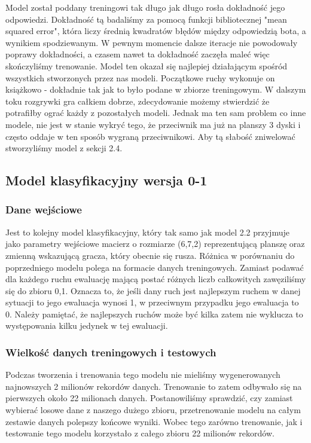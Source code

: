 \documentclass[12pt]{article}
\begin{document}
Model został poddany treningowi tak długo jak długo rosła dokładność jego odpowiedzi. Dokładność tą badaliśmy za pomocą funkcji bibliotecznej "mean squared error", która liczy średnią kwadratów błędów między odpowiedzią bota, a wynikiem spodziewanym. W pewnym momencie dalsze iteracje nie powodowały poprawy dokładności, a czasem nawet ta dokładność zaczęła maleć więc skończyliśmy trenowanie. Model ten okazał się najlepiej działającym spośród wszystkich stworzonych przez nas modeli. Początkowe ruchy wykonuje on książkowo - dokładnie tak jak to było podane w zbiorze treningowym. W dalszym toku rozgrywki gra całkiem dobrze, zdecydowanie możemy stwierdzić że potrafiłby ograć każdy z pozostałych modeli. Jednak ma ten sam problem co inne modele, nie jest w stanie wykryć tego, że przeciwnik ma już na planszy 3 dyski i często oddaje w ten sposób wygraną przeciwnikowi. Aby tą słabość zniwelować stworzyliśmy model z sekcji 2.4.

\subsection{Model klasyfikacyjny wersja 0-1}

\subsubsection{Dane wejściowe}

Jest to kolejny model klasyfikacyjny, który tak samo jak model 2.2 przyjmuje jako parametry wejściowe macierz o rozmiarze (6,7,2) reprezentującą planszę oraz zmienną wskazującą gracza, który obecnie się rusza. Różnica w porównaniu do poprzedniego modelu polega na formacie danych treningowych. Zamiast podawać dla każdego ruchu ewaluację mającą postać różnych liczb całkowitych zawęziliśmy się do zbioru {0,1}. Oznacza to, że jeśli dany ruch jest najlepszym ruchem w danej sytuacji to jego ewaluacja wynosi 1, w przeciwnym przypadku jego ewaluacja to 0. Należy pamiętać, że najlepszych ruchów może być kilka zatem nie wyklucza to występowania kilku jedynek w tej ewaluacji.

\subsubsection{Wielkość danych treningowych i testowych}

Podczas tworzenia i trenowania tego modelu nie mieliśmy wygenerowanych najnowszych 2 milionów rekordów danych. Trenowanie to zatem odbywało się na pierwszych około 22 milionach danych. Postanowiliśmy sprawdzić, czy zamiast wybierać losowe dane z naszego dużego zbioru, przetrenowanie modelu na całym zestawie danych polepszy końcowe wyniki. Wobec tego zarówno trenowanie, jak i testowanie tego modelu korzystało z całego zbioru 22 milionów rekordów.
\end{document}
